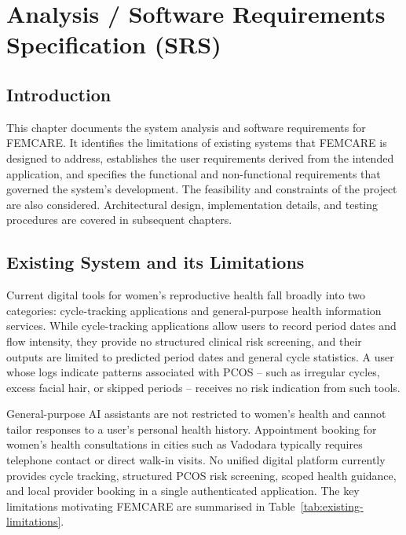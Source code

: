 
\chapter{Analysis / Software Requirements Specification (SRS)}\doublespacing
\label{chap:srs}

\section{Introduction}
\label{sec:srs-intro}

This chapter documents the system analysis and software requirements for FEMCARE. It identifies the limitations of existing systems that FEMCARE is designed to address, establishes the user requirements derived from the intended application, and specifies the functional and non-functional requirements that governed the system's development. The feasibility and constraints of the project are also considered. Architectural design, implementation details, and testing procedures are covered in subsequent chapters.

\section{Existing System and its Limitations}
\label{sec:existing}

Current digital tools for women's reproductive health fall broadly into two categories: cycle-tracking applications and general-purpose health information services. While cycle-tracking applications allow users to record period dates and flow intensity, they provide no structured clinical risk screening, and their outputs are limited to predicted period dates and general cycle statistics. \cite{epstein2017}\cite{li2021} A user whose logs indicate patterns associated with PCOS -- such as irregular cycles, excess facial hair, or skipped periods -- receives no risk indication from such tools. \cite{zad2024}\cite{ahmed2023}

General-purpose AI assistants are not restricted to women's health and cannot tailor responses to a user's personal health history. \cite{kim2024} Appointment booking for women's health consultations in cities such as Vadodara typically requires telephone contact or direct walk-in visits. No unified digital platform currently provides cycle tracking, structured PCOS risk screening, scoped health guidance, and local provider booking in a single authenticated application. The key limitations motivating FEMCARE are summarised in Table~\ref{tab:existing-limitations}.

